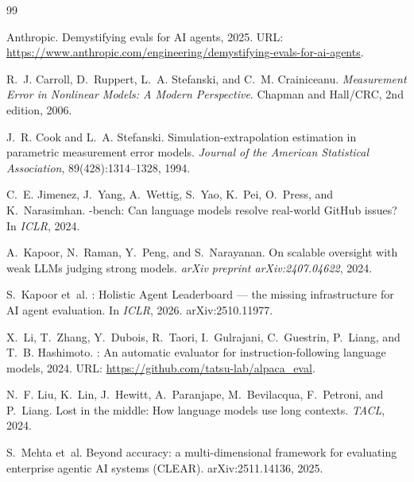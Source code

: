 \documentclass[11pt]{article}
\begin{document}

\begin{thebibliography}{99}

Anthropic.
\newblock Demystifying evals for AI agents, 2025.
\newblock URL: \url{https://www.anthropic.com/engineering/demystifying-evals-for-ai-agents}.

R.~J. Carroll, D.~Ruppert, L.~A. Stefanski, and C.~M. Crainiceanu.
\newblock \emph{Measurement Error in Nonlinear Models: A Modern Perspective}.
\newblock Chapman and Hall/CRC, 2nd edition, 2006.

J.~R. Cook and L.~A. Stefanski.
\newblock Simulation-extrapolation estimation in parametric measurement error models.
\newblock \emph{Journal of the American Statistical Association}, 89(428):1314--1328, 1994.

C.~E. Jimenez, J.~Yang, A.~Wettig, S.~Yao, K.~Pei, O.~Press, and K.~Narasimhan.
-bench: Can language models resolve real-world {GitHub} issues?
\newblock In \emph{ICLR}, 2024.

A.~Kapoor, N.~Raman, Y.~Peng, and S.~Narayanan.
\newblock On scalable oversight with weak {LLMs} judging strong models.
\newblock \emph{arXiv preprint arXiv:2407.04622}, 2024.

S.~Kapoor et~al.
: Holistic Agent Leaderboard --- the missing infrastructure for AI agent evaluation.
\newblock In \emph{ICLR}, 2026.
\newblock arXiv:2510.11977.

X.~Li, T.~Zhang, Y.~Dubois, R.~Taori, I.~Gulrajani, C.~Guestrin, P.~Liang, and T.~B. Hashimoto.
: An automatic evaluator for instruction-following language models, 2024.
\newblock URL: \url{https://github.com/tatsu-lab/alpaca_eval}.

N.~F. Liu, K.~Lin, J.~Hewitt, A.~Paranjape, M.~Bevilacqua, F.~Petroni, and P.~Liang.
\newblock Lost in the middle: How language models use long contexts.
\newblock \emph{TACL}, 2024.

S.~Mehta et~al.
\newblock Beyond accuracy: a multi-dimensional framework for evaluating enterprise agentic AI systems ({CLEAR}).
\newblock arXiv:2511.14136, 2025.


\end{thebibliography}
\end{document}
